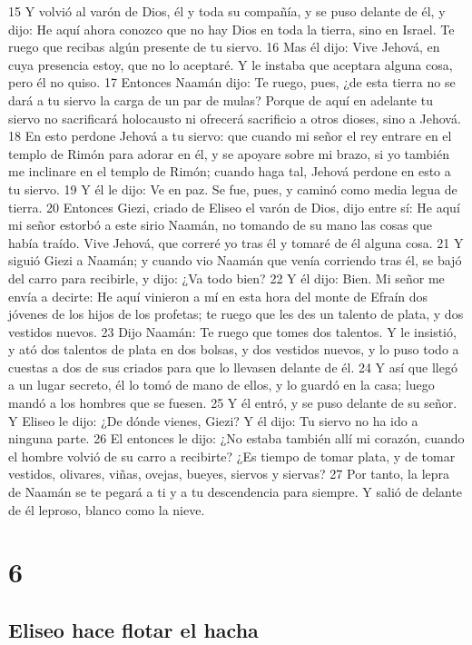 15 Y volvió al varón de Dios, él y toda su compañía, y se puso delante de él, y dijo: He aquí ahora conozco que no hay Dios en toda la tierra, sino en Israel. Te ruego que recibas algún presente de tu siervo. 
16 Mas él dijo: Vive Jehová, en cuya presencia estoy, que no lo aceptaré. Y le instaba que aceptara alguna cosa, pero él no quiso.
17 Entonces Naamán dijo: Te ruego, pues, ¿de esta tierra no se dará a tu siervo la carga de un par de mulas? Porque de aquí en adelante tu siervo no sacrificará holocausto ni ofrecerá sacrificio a otros dioses, sino a Jehová.
18 En esto perdone Jehová a tu siervo: que cuando mi señor el rey entrare en el templo de Rimón para adorar en él, y se apoyare sobre mi brazo, si yo también me inclinare en el templo de Rimón; cuando haga tal, Jehová perdone en esto a tu siervo.
19 Y él le dijo: Ve en paz. Se fue, pues, y caminó como media legua de tierra.
20 Entonces Giezi, criado de Eliseo el varón de Dios, dijo entre sí: He aquí mi señor estorbó a este sirio Naamán, no tomando de su mano las cosas que había traído. Vive Jehová, que correré yo tras él y tomaré de él alguna cosa.
21 Y siguió Giezi a Naamán; y cuando vio Naamán que venía corriendo tras él, se bajó del carro para recibirle, y dijo: ¿Va todo bien?
22 Y él dijo: Bien. Mi señor me envía a decirte: He aquí vinieron a mí en esta hora del monte de Efraín dos jóvenes de los hijos de los profetas; te ruego que les des un talento de plata,  y dos vestidos nuevos.
23 Dijo Naamán: Te ruego que tomes dos talentos.  Y le insistió, y ató dos talentos de plata en dos bolsas, y dos vestidos nuevos, y lo puso todo a cuestas a dos de sus criados para que lo llevasen delante de él.
24 Y así que llegó a un lugar secreto, él lo tomó de mano de ellos, y lo guardó en la casa; luego mandó a los hombres que se fuesen.
25 Y él entró, y se puso delante de su señor. Y Eliseo le dijo: ¿De dónde vienes, Giezi? Y él dijo: Tu siervo no ha ido a ninguna parte.
26 El entonces le dijo: ¿No estaba también allí mi corazón, cuando el hombre volvió de su carro a recibirte? ¿Es tiempo de tomar plata, y de tomar vestidos, olivares, viñas, ovejas, bueyes, siervos y siervas?
27 Por tanto, la lepra de Naamán se te pegará a ti y a tu descendencia para siempre. Y salió de delante de él leproso, blanco como la nieve.

\chapter{6}

\section*{Eliseo hace flotar el hacha}

